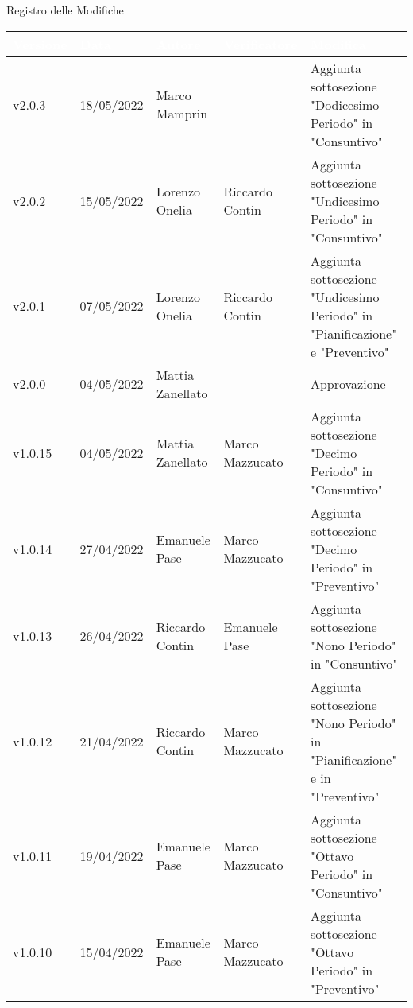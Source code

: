 \begin{center}
  \huge{Registro delle Modifiche}
\end{center}
\renewcommand\arraystretch{1,5}
{\centering
\begin{longtable}{|C{1.8cm}|C{2.1cm}|C{2cm}|C{2.4cm}|L{4.4cm}|}
  \hline
  \textcolor[HTML]{FFFFFF}{\textbf{Versione}} & \textcolor[HTML]{FFFFFF}{\textbf{Data}} & \textcolor[HTML]{FFFFFF}{\textbf{Autore}}  & \textcolor[HTML]{FFFFFF}{\textbf{Verificatore}} & \textcolor[HTML]{FFFFFF}{\textbf{Modifica}}    \\ \hline
  v2.0.3        & 18/05/2022    & Marco Mamprin   &   & Aggiunta sottosezione "Dodicesimo Periodo" in "Consuntivo" \\ \hline
  v2.0.2        & 15/05/2022    & Lorenzo Onelia   &  Riccardo Contin & Aggiunta sottosezione "Undicesimo Periodo" in "Consuntivo" \\ \hline
  v2.0.1        & 07/05/2022    & Lorenzo Onelia   &  Riccardo Contin  & Aggiunta sottosezione "Undicesimo Periodo" in "Pianificazione" e "Preventivo" \\ \hline
  v2.0.0        & 04/05/2022    & Mattia Zanellato   &  -  & Approvazione \\ \hline
  v1.0.15       & 04/05/2022    & Mattia Zanellato   &  Marco Mazzucato  & Aggiunta sottosezione "Decimo Periodo" in "Consuntivo" \\ \hline
  v1.0.14       & 27/04/2022    & Emanuele Pase   &   Marco Mazzucato & Aggiunta sottosezione "Decimo Periodo" in "Preventivo" \\ \hline
  v1.0.13       & 26/04/2022    & Riccardo Contin   &  Emanuele Pase  & Aggiunta sottosezione "Nono Periodo" in "Consuntivo" \\ \hline
  v1.0.12       & 21/04/2022    & Riccardo Contin   &  Marco Mazzucato   & Aggiunta sottosezione "Nono Periodo" in "Pianificazione" e in "Preventivo" \\ \hline
  v1.0.11       & 19/04/2022    & Emanuele Pase   &  Marco Mazzucato   & Aggiunta sottosezione "Ottavo Periodo" in "Consuntivo" \\ \hline
  v1.0.10       & 15/04/2022    & Emanuele Pase   &  Marco Mazzucato   & Aggiunta sottosezione "Ottavo Periodo" in "Preventivo" \\ \hline

\end{longtable}}
